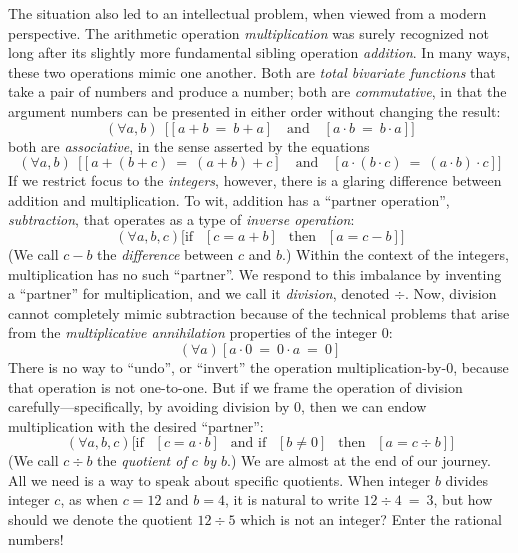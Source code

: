 The situation also led to an intellectual problem, when viewed from a
modern perspective.  
The arithmetic operation {\it multiplication} was surely recognized not
long after its slightly more fundamental sibling operation {\it
  addition}.  In many ways, these two operations mimic one another.
Both are {\em total bivariate functions} that take a pair of numbers
and produce a number; both are {\em commutative}, in that the argument
numbers can be presented in either order without changing the result:
\[ (\forall a,b) \ \ \big[ [a+b \ = \ b+a]
 \ \ \ \mbox{ and } \ \ \
[a \cdot b \ = \ b \cdot a] \big]
\]
both are {\em associative}, in the sense asserted by the equations
\[
(\forall a,b) \ \ \big[ [a+(b+c) \ = \ (a+b)+c]
 \ \ \ \mbox{ and } \ \ \ 
[a \cdot (b \cdot c) \ = \ (a \cdot b) \cdot c] \big]
\]
If we restrict focus to the {\em integers}, however, there is a
glaring difference between addition and multiplication.  To wit,
addition has a ``partner operation'', {\it subtraction}, that operates
as a type of {\it inverse operation}:
\[ (\forall a, b, c) \big[ \mbox{if } \ \ [c = a + b] \ \ \mbox{ then }
  \ \ [a = c-b] \big]
\]
(We call $c-b$ the {\em difference} between $c$ and $b$.)  Within the
context of the integers, multiplication has no such ``partner''.  We
respond to this imbalance by inventing a ``partner'' for
multiplication, and we call it {\it division}, denoted $\div$.  Now,
division cannot completely mimic subtraction because of the technical
problems that arise from the {\em multiplicative annihilation}
\index{$0$: the multiplicative annihilator} properties of the integer
$0$:
\[ (\forall a) \left[ a \cdot 0 \ = \ 0 \cdot a \ = \ 0 \right] \] 
There is no way to ``undo'', or ``invert'' the operation
multiplication-by-$0$, because that operation is not one-to-one.  But
if we frame the operation of division carefully---specifically, by
avoiding division by $0$, then we can endow multiplication with the
desired ``partner'':
\[ (\forall a, b, c) \big[ \mbox{if } \ \ [c = a \cdot b] \ \
\mbox{ and if } \ \ [b \neq 0] \ \
 \mbox{ then }
  \ \ [a = c \div b] \big]
\]
(We call $c \div b$ the {\em quotient of $c$ by $b$}.)
 We are almost at the end of our journey.  All we need
is a way to speak about specific quotients.  When integer $b$ divides
integer $c$, as when $c = 12$ and $b = 4$, it is natural to write $12
\div 4 \ = \ 3$, but how should we denote the quotient $12 \div 5$
which is not an integer?  Enter the rational numbers!


